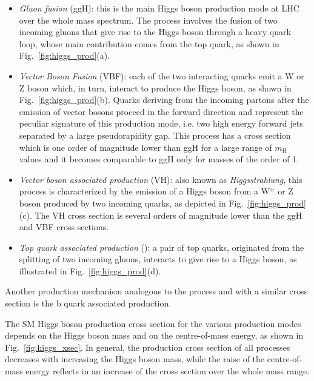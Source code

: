 \begin{itemize}
\item \emph{Gluon fusion} (ggH): this is the main Higgs boson production mode at LHC over the whole mass spectrum. The process involves the fusion of two incoming gluons that give rise to the Higgs boson through a heavy quark loop, whose main contribution comes from the top quark, as shown in Fig.~\ref{fig:higgs_prod}(a).

\item \emph{Vector Boson Fusion} (VBF): each of the two interacting quarks emit a W or Z boson which, in turn, interact to produce the Higgs boson, as shown in Fig.~\ref{fig:higgs_prod}(b). Quarks deriving from the incoming partons after the emission of vector bosons proceed in the forward direction and represent the peculiar signature of this production mode, i.e. two high energy forward jets separated by a large pseudorapidity gap. This process has a cross section which is one order of magnitude lower than ggH for a large range of $m_\mathrm{H}$ values and it becomes comparable to ggH only for masses of the order of 1\TeV.

\item \emph{Vector boson associated production} (VH): also known as \emph{Higgsstrahlung}, this process is characterized by the emission of a Higgs boson from a $\mathrm{W}^\pm$ or Z boson produced by two incoming quarks, as depicted in Fig.~\ref{fig:higgs_prod}(c). The VH cross section is several orders of magnitude lower than the ggH and VBF cross sections.

\item \emph{Top quark associated production} (\ttH): a pair of top quarks, originated from the splitting of two incoming gluons, interacts to give rise to a Higgs boson, as illustrated in Fig.~\ref{fig:higgs_prod}(d).
\end{itemize}

\noindent Another production mechanism analogous to the \ttH process and with a similar cross section is the b quark associated production.

The SM Higgs boson production cross section for the various production modes depends on the Higgs boson mass and on the centre-of-mass energy, as shown in Fig.~\ref{fig:higgs_xsec}. In general, the production cross section of all processes decreases with increasing the Higgs boson mass, while the raise of the centre-of-mass energy reflects in an increase of the cross section over the whole mass range.

